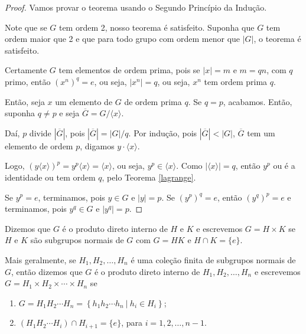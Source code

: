	\begin{proof}
		Vamos provar o teorema usando o Segundo Princípio da Indução. 
		\par\vspace{0.3cm} Note que se $G$ tem ordem 2, nosso teorema é satisfeito. 
		Suponha que $G$ tem ordem maior que 2 e que para todo grupo com ordem menor que $|G|$, 
		o teorema é satisfeito. 
		\par\vspace{0.3cm} Certamente $G$ tem elementos de ordem prima, pois se $|x| = m$ e $m = qn$, 
		com $q$ primo, então $(x^n)^q = e$, ou seja, $|x^n| = q$, ou seja, $x^n$ tem ordem prima $q$.
		\par\vspace{0.3cm} Então, seja $x$ um elemento de $G$ de ordem prima $q$. Se $q = p$, acabamos. 
		Então, suponha $q\neq p$ e seja $\overline{G} = G/\langle x \rangle$.
		\par\vspace{0.3cm} Daí, $p$ divide $|\overline{G}|$, pois $|\overline{G}| = |G|/q$. Por indução, 
		pois $|\overline{G}|<|G|$, $\overline{G}$ tem um elemento de ordem $p$, digamos 
		$y\cdot\langle x \rangle$.
		\par\vspace{0.3cm} Logo, $(y\langle x \rangle)^p = y^p\langle x \rangle = \langle x\rangle$, ou seja,
		$y^p\in\langle x \rangle$. Como $|\langle x \rangle| = q$, então $y^p$ ou é a identidade ou 
		tem ordem $q$, pelo Teorema \ref{lagrange}.
		\par\vspace{0.3cm} Se $y^p = e$, terminamos, pois $y\in G$ e $|y|=p$. Se $(y^p)^q = e$, 
		então $(y^q)^p = e$ e terminamos, pois $y^q\in G$ e $|y^q| = p$.
	\end{proof}
	\begin{deff}
	\label{def prod direto interno}
		Dizemos que $G$ é o produto direto interno de $H$ e $K$ e escrevemos $G = H\times K$ se 
		$H$ e $K$ são subgrupos normais de $G$ com $G = HK$ e $H\cap K = \{e\}$.
		\par\vspace{0.3cm} Mais geralmente, se $H_1, H_2, \dots, H_n$ é uma coleção finita de 
		subgrupos normais de $G$, então dizemos que $G$ é o produto direto interno de $H_1, H_2, \dots, H_n$ 
		e escrevemos $G = H_1\times H_2\times\cdots\times H_n$ se
		\begin{enumerate}
			\item $G = H_1H_2\cdots H_n = \left\{ h_1h_2\cdots h_n \ | \ h_i\in H_i\right\}$;
			\item $(H_1H_2\cdots H_i)\cap H_{i+1} = \{e\}$, para $i = 1, 2, \dots, n-1$.
		\end{enumerate}
	\end{deff}
